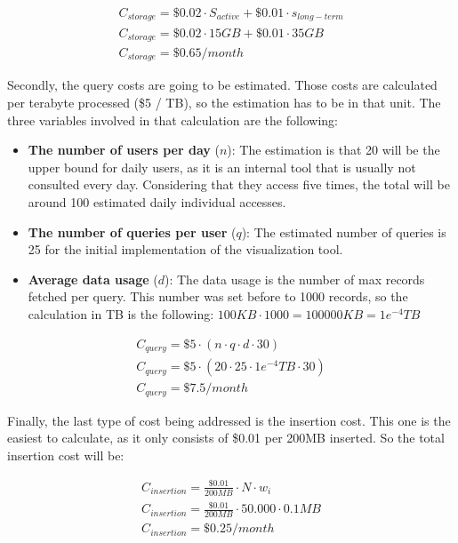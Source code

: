 \documentclass[english, 12pt, a4paper, sci, utf8, a-1b, online]{aaltothesis}
\begin{document}
\begin{equation}
\begin{split}
    C_{storage} = \$0.02 \cdot S_{active} + \$0.01 \cdot s_{long-term} \\
    C_{storage} = \$0.02 \cdot 15GB + \$0.01 \cdot 35GB \\
    C_{storage} = \$ 0.65 / month
\end{split}
\end{equation}

Secondly, the query costs are going to be estimated. Those costs are calculated per terabyte processed (\$5 / TB), so the estimation has to be in that unit. The three variables involved in that calculation are the following:

\begin{itemize}
    \item \textbf{The number of users per day} ($n$): The estimation is that 20 will be the upper bound for daily users, as it is an internal tool that is usually not consulted every day. Considering that they access five times, the total will be around 100 estimated daily individual accesses.
    \item \textbf{The number of queries per user} ($q$): The estimated number of queries is 25 for the initial implementation of the visualization tool.
    \item \textbf{Average data usage} ($d$): The data usage is the number of max records fetched per query. This number was set before to 1000 records, so the calculation in TB is the following: $100KB \cdot 1000 = 100000KB = 1e^{-4}TB$
    
\end{itemize}

\begin{equation}
\begin{split}
    C_{query} = \$5 \cdot (n \cdot q \cdot d \cdot 30) \\
    C_{query} = \$5 \cdot (20 \cdot 25 \cdot 1e^{-4}TB \cdot 30)\\
    C_{query} = \$7.5 / month
\end{split}
\end{equation}

Finally, the last type of cost being addressed is the insertion cost. This one is the easiest to calculate, as it only consists of \$0.01 per 200MB inserted. So the total insertion cost will be:

\begin{equation}
\begin{split}
    C_{insertion} = \frac{\$0.01}{200MB} \cdot N \cdot w_i \\
    C_{insertion} = \frac{\$0.01}{200MB} \cdot 50.000 \cdot 0.1MB \\
    C_{insertion} = \$0.25 / month
\end{split}
\end{equation}
\end{document}
